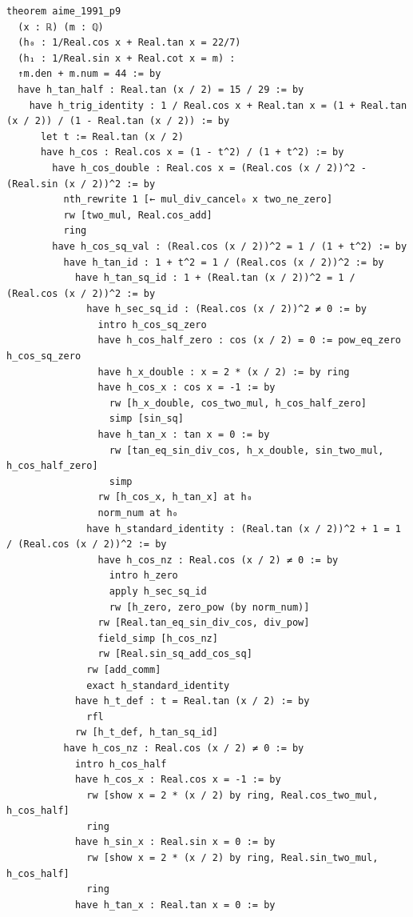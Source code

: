 \begin{lstlisting}[basicstyle=\small\fontspec{DejaVu Sans Mono},columns=fullflexible,keepspaces=true,breaklines=true,showstringspaces=false]
theorem aime_1991_p9
  (x : ℝ) (m : ℚ)
  (h₀ : 1/Real.cos x + Real.tan x = 22/7)
  (h₁ : 1/Real.sin x + Real.cot x = m) :
  ↑m.den + m.num = 44 := by
  have h_tan_half : Real.tan (x / 2) = 15 / 29 := by
    have h_trig_identity : 1 / Real.cos x + Real.tan x = (1 + Real.tan (x / 2)) / (1 - Real.tan (x / 2)) := by
      let t := Real.tan (x / 2)
      have h_cos : Real.cos x = (1 - t^2) / (1 + t^2) := by
        have h_cos_double : Real.cos x = (Real.cos (x / 2))^2 - (Real.sin (x / 2))^2 := by
          nth_rewrite 1 [← mul_div_cancel₀ x two_ne_zero]
          rw [two_mul, Real.cos_add]
          ring
        have h_cos_sq_val : (Real.cos (x / 2))^2 = 1 / (1 + t^2) := by
          have h_tan_id : 1 + t^2 = 1 / (Real.cos (x / 2))^2 := by
            have h_tan_sq_id : 1 + (Real.tan (x / 2))^2 = 1 / (Real.cos (x / 2))^2 := by
              have h_sec_sq_id : (Real.cos (x / 2))^2 ≠ 0 := by
                intro h_cos_sq_zero
                have h_cos_half_zero : cos (x / 2) = 0 := pow_eq_zero h_cos_sq_zero
                have h_x_double : x = 2 * (x / 2) := by ring
                have h_cos_x : cos x = -1 := by
                  rw [h_x_double, cos_two_mul, h_cos_half_zero]
                  simp [sin_sq]
                have h_tan_x : tan x = 0 := by
                  rw [tan_eq_sin_div_cos, h_x_double, sin_two_mul, h_cos_half_zero]
                  simp
                rw [h_cos_x, h_tan_x] at h₀
                norm_num at h₀
              have h_standard_identity : (Real.tan (x / 2))^2 + 1 = 1 / (Real.cos (x / 2))^2 := by
                have h_cos_nz : Real.cos (x / 2) ≠ 0 := by
                  intro h_zero
                  apply h_sec_sq_id
                  rw [h_zero, zero_pow (by norm_num)]
                rw [Real.tan_eq_sin_div_cos, div_pow]
                field_simp [h_cos_nz]
                rw [Real.sin_sq_add_cos_sq]
              rw [add_comm]
              exact h_standard_identity
            have h_t_def : t = Real.tan (x / 2) := by
              rfl
            rw [h_t_def, h_tan_sq_id]
          have h_cos_nz : Real.cos (x / 2) ≠ 0 := by
            intro h_cos_half
            have h_cos_x : Real.cos x = -1 := by
              rw [show x = 2 * (x / 2) by ring, Real.cos_two_mul, h_cos_half]
              ring
            have h_sin_x : Real.sin x = 0 := by
              rw [show x = 2 * (x / 2) by ring, Real.sin_two_mul, h_cos_half]
              ring
            have h_tan_x : Real.tan x = 0 := by

\end{lstlisting}
